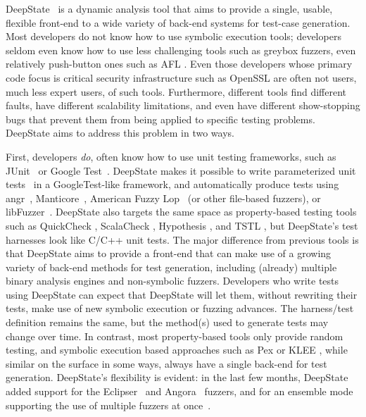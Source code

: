 DeepState~\cite{DeepState} is a dynamic analysis tool that aims to provide a single, usable, flexible front-end to a wide variety of back-end systems for test-case generation.  Most developers do not know how to use symbolic execution tools; developers seldom even know how to use less challenging tools such as greybox fuzzers, even relatively push-button ones such as AFL \cite{aflfuzz}.  Even those developers whose primary code focus is critical security infrastructure such as OpenSSL are often not users, much less expert users, of such tools.  Furthermore, different tools find different faults, have different scalability limitations, and even have different show-stopping bugs that prevent them from being applied to specific testing problems.  DeepState aims to address this problem in two ways.

First, developers \emph{do}, often know how to use unit testing frameworks, such as JUnit~\cite{JUnit} or Google Test~\cite{GoogleTest}. DeepState makes it possible to write parameterized unit tests~\cite{ParamUnit} in a GoogleTest-like framework, and automatically produce tests using angr~\cite{angr1,angr2,angr3}, Manticore~\cite{Manticore}, American Fuzzy Lop~\cite{aflfuzz} (or other file-based fuzzers), or libFuzzer~\cite{libFuzzer}.  DeepState also targets the same space as property-based testing tools such as QuickCheck \cite{ClaessenH00}, ScalaCheck \cite{ScalaCheckDoc}, Hypothesis \cite{Hypothesis}, and TSTL \cite{NFM15,tstlsttt}, but DeepState's test harnesses look like C/C++ unit tests. The major difference from previous tools is that DeepState aims to provide a front-end that can make use of a growing variety of back-end methods for test generation, including (already) multiple binary analysis engines and non-symbolic fuzzers.  Developers who write tests using DeepState can expect that DeepState will let them, without rewriting their tests, make use of new symbolic execution or fuzzing advances.  The harness/test definition remains the same, but the method(s) used to generate tests may change over time.  In contrast, most property-based tools only provide random testing, and symbolic execution based approaches such as Pex \cite{Pex,UnitMeister} or KLEE \cite{KLEE}, while similar on the surface in some ways, always have a single back-end for test generation. DeepState's flexibility is evident: in the last few months, DeepState added support for the Eclipser~\cite{eclipser} and Angora~\cite{angora} fuzzers, and for an ensemble mode  supporting  the use  of multiple fuzzers at once~\cite{ensemble}.

